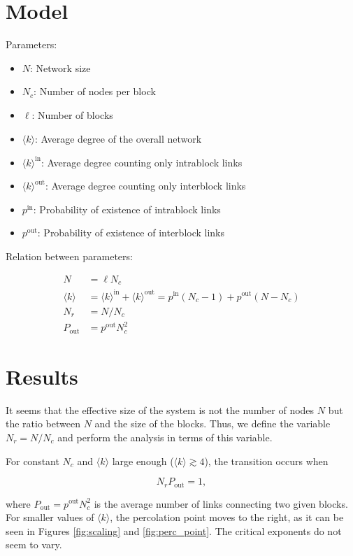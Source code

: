 \documentclass{article}
\newcommand{\pin}{p^{\mathrm{in}}}
\newcommand{\pout}{p^{\mathrm{out}}}
\newcommand{\Pout}{P_{\mathrm{out}}}
\newcommand{\kin}{\langle k \rangle^{\mathrm{in}}}
\newcommand{\kout}{\langle k \rangle^{\mathrm{out}}}
\newcommand{\meank}{\langle k \rangle}
\begin{document}
\section{Model}

Parameters:

\begin{itemize}
\item $N$: Network size
\item $N_c$: Number of nodes per block
\item $\ell$: Number of blocks
\item $\meank$: Average degree of the overall network
\item $\kin$: Average degree counting only intrablock links
\item $\kout$: Average degree counting only interblock links
\item $\pin$: Probability of existence of intrablock links
\item $\pout$: Probability of existence of interblock links
\end{itemize}

Relation between parameters:

\begin{align}
N &= \ell N_c \\
\meank &= \kin + \kout =  \pin (N_c - 1) + \pout (N - N_c)\\
N_r &= N/N_c\\
\Pout &= \pout N_c^2
\end{align}


\section{Results}

It seems that the effective size of the system is not the number of nodes $N$ but the ratio between $N$ and the size of the blocks. Thus, we define the variable $N_r = N/N_c$ and perform the analysis in terms of this variable.

For constant $N_c$ and  $\meank$ large enough ($\meank \gtrsim 4$), the transition occurs when 

\begin{equation}
N_r \Pout = 1,
\end{equation}

where $\Pout = \pout N_c^2$ is the average number of links connecting two given blocks. For smaller values of $\meank$, the percolation point moves to the right, as it can be seen in Figures \ref{fig:scaling} and \ref{fig:perc_point}. The critical exponents do not seem to vary.
\end{document}
